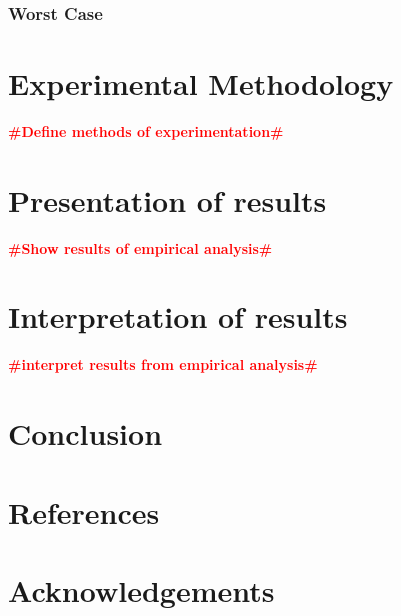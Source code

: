 \documentclass[12pt,a4paper,titlepage]{article}
\newcommand{\todo}[1]{\textcolor{red}{\textbf{\##1\#}}}
\begin{document}
\subsubsection{Worst Case}



\section{Experimental Methodology}

\todo{Define methods of experimentation}

\section{Presentation of results}

\todo{Show results of empirical analysis}

\section{Interpretation of results}

\todo{interpret results from empirical analysis}

\section{Conclusion}

\section{References}

\section{Acknowledgements}
\end{document}

